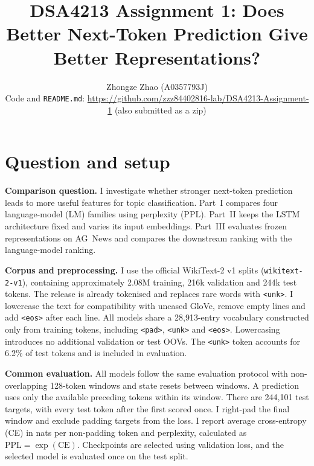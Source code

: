\documentclass[10pt]{article}
\title{\vspace{-1.2cm}DSA4213 Assignment 1: Does Better Next-Token Prediction Give Better Representations?}
\author{Zhongze Zhao (A0357793J) \\ \small Code and \texttt{README.md}: \url{https://github.com/zzz84402816-lab/DSA4213-Assignment-1} (also submitted as a zip)}
\date{\vspace{-0.6cm}}
\begin{document}
\maketitle

\section{Question and setup}
\textbf{Comparison question.} I investigate whether stronger next-token prediction leads to more useful features
for topic classification. Part~I compares four language-model (LM) families using perplexity (PPL). Part~II keeps
the LSTM architecture fixed and varies its input embeddings. Part~III evaluates frozen representations on AG~News
and compares the downstream ranking with the language-model ranking.

\textbf{Corpus and preprocessing.} I use the official WikiText-2 v1 splits (\texttt{wikitext-2-v1}), containing
approximately 2.08M training, 216k validation and 244k test tokens. The release is already tokenised and replaces
rare words with \texttt{<unk>}. I lowercase the text for compatibility with uncased GloVe, remove empty lines and
add \texttt{<eos>} after each line. All models share a 28,913-entry vocabulary constructed only from training
tokens, including \texttt{<pad>}, \texttt{<unk>} and \texttt{<eos>}. Lowercasing introduces no additional
validation or test OOVs. The \texttt{<unk>} token accounts for 6.2\% of test tokens and is included in evaluation.

\textbf{Common evaluation.} All models follow the same evaluation protocol with non-overlapping 128-token windows
and state resets between windows. A prediction uses only the available preceding tokens within its window. There
are 244,101 test targets, with every test token after the first scored once. I right-pad the final window and
exclude padding targets from the loss. I report average cross-entropy (CE) in nats per non-padding token and
perplexity, calculated as $\mathrm{PPL}=\exp(\mathrm{CE})$. Checkpoints are selected using validation loss, and the
selected model is evaluated once on the test split.
\end{document}
